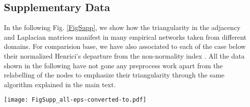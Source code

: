 \documentclass[prx,twocolumn,amsmath,noshowkeys,noshowpacs,amssymb]{revtex4-2}
\begin{document}

\subsection{Supplementary Data}
\label{sec:AppB}
In the following Fig. \ref{FigSupp}, we {show how the triangularity in the adjacency and Laplacian matrices manifest in many empirical networks taken from different domains. For comparision base, we have also associated to each of the case below their normalized Henrici's departure from the non-normality index \cite{Trefethen2005}. All the data shown in the following have not gone any preprocess work apart from the relabelling of the nodes to emphasize their triangularity through the same algorithm explained in the main text.}

\begin{figure*}
	\centering
	\texttt{[image: FigSupp\_all-eps-converted-to.pdf]}
	\caption{\textbf{Adjacency matrices and Laplacian eigenvectors of selected empirical networks.} We present the colormaps of the adjacency matriced and Laplacian eigenvectors of several empirical network which represents food webs, hierarchical organization between animals and human social networks (as referred in the titles of the panels). As shown, most of the networks manifest a strong triangular shape further strengthening our result. All the networks presented here have been hierarchally relabelled as explained in the main text.}
	\label{FigSupp}
\end{figure*}
\end{document}
